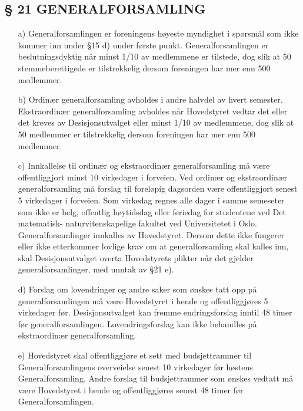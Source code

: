 \subsection*{§ 21 GENERALFORSAMLING}

\begin{itemize}
\item[a)] Generalforsamlingen er foreningens høyeste myndighet i spørsmål som
ikke kommer inn under §15 d) under første punkt. Generalforsamlingen er
beslutningsdyktig når minst 1/10 av medlemmene er tilstede, dog slik
at 50 stemmeberettigede er tilstrekkelig dersom foreningen har mer enn
500 medlemmer.

\item[b)] Ordinær generalforsamling avholdes i andre halvdel av hvert 
semester.  Ekstraordinær generalforsamling avholdes når Hovedstyret 
vedtar det eller det kreves av Desisjonsutvalget eller minst 1/10 av 
medlemmene, dog slik at 50 medlemmer er tilstrekkelig dersom foreningen 
har mer enn 500 medlemmer.

\item[c)] Innkallelse til ordinær og ekstraordinær generalforsamling må være
offentliggjort minst 10 virkedager i forveien.  Ved ordinær og ekstraordinær
generalforsamling må forslag til foreløpig dagsorden være offentliggjort 
senest 5 virkedager i forveien.  Som virkedag regnes alle dager i samme 
semeseter som ikke er helg, offentlig høytidsdag eller feriedag for 
studentene ved Det matematisk- naturvitenskapelige fakultet ved 
Universitetet i Oslo.  Generalforsamlinger innkalles av Hovedstyret.  
Dersom dette ikke fungerer eller ikke etterkommer lovlige krav om at 
generalforsamling skal kalles inn, skal Desisjonsutvalget overta 
Hovedstyrets plikter når det gjelder generalforsamlinger, med unntak av 
§21 e).

\item[d)] Forslag om lovendringer og andre saker som ønskes tatt opp på
generalforsamlingen må være Hovedstyret i hende og offentliggjøres 5
virkedager før.  Desisjonsutvalget kan fremme endringsforslag inntil 48
timer før generalforsamlingen.  Lovendringsforslag kan ikke behandles
på ekstraordinær generalforsamling.

\item[e)] Hovedstyret skal offentliggjøre et sett med budsjettrammer til
Generalforsamlingens overveielse senest 10 virkedager før høstens
Generalforsamling.  Andre forslag til budsjettrammer som ønskes
vedtatt må være Hovedstyret i hende og offentliggjøres senest 48
timer før Generalforsamlingen.


\end{itemize}
